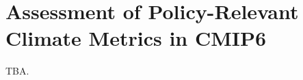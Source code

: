 


\chapter{Assessment of Policy-Relevant Climate Metrics in \acs{CMIP}6}
\label{ch:04:assessment_climate_metrics}

TBA.
